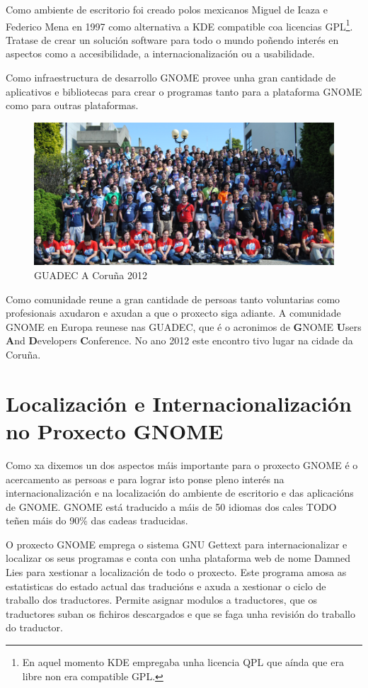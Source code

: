 Como ambiente de escritorio foi creado polos mexicanos Miguel de Icaza e Federico Mena en 1997 como alternativa a KDE compatible coa licencias GPL\footnote{En aquel momento KDE empregaba unha licencia QPL que aínda que era libre non era compatible GPL.}. Tratase de crear un solución software para todo o mundo poñendo interés en aspectos como a accesibilidade, a internacionalización ou a usabilidade.

Como infraestructura de desarrollo GNOME provee unha gran cantidade de aplicativos e bibliotecas para crear o programas tanto para a plataforma GNOME como para outras plataformas.

\begin{figure}[h!]
    \centering
    \includegraphics[width=\textwidth]{img/guadec_2012.png}
    \caption{GUADEC A Coruña 2012}
    \label{fig:guadec2012}
\end{figure}

Como comunidade reune a gran cantidade de persoas tanto voluntarias como profesionais axudaron e axudan a que o proxecto siga adiante. A comunidade GNOME en Europa reunese nas GUADEC, que é o acronimos de \textbf{G}NOME \textbf{U}sers \textbf{A}nd \textbf{D}evelopers \textbf{C}onference. No ano 2012 este encontro tivo lugar na cidade da Coruña.

\section{Localización e Internacionalización no Proxecto GNOME}
Como xa dixemos un dos aspectos máis importante para o proxecto GNOME é o acercamento as persoas e para lograr isto ponse pleno interés na internacionalización e na localización do ambiente de escritorio e das aplicacións de GNOME. GNOME está traducido a máis de 50 idiomas dos cales TODO teñen máis do 90\% das cadeas traducidas.

O proxecto GNOME emprega o sistema GNU Gettext para internacionalizar e localizar os seus programas e conta con unha plataforma web de nome Damned Lies para xestionar a localización de todo o proxecto. Este programa amosa as estatisticas do estado actual das traducións e axuda a xestionar o ciclo de traballo dos traductores. Permite asignar modulos a traductores, que os traductores suban os fichiros descargados e que se faga unha revisión do traballo do traductor.

